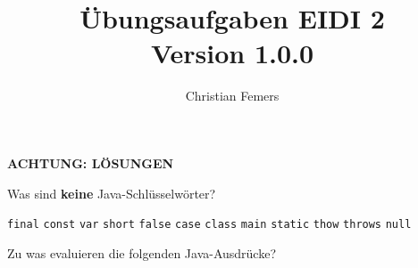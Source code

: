 \documentclass[11pt]{exam} %
\title{Übungsaufgaben EIDI 2 \\ \small \color{magenta}Version 1.0.0}
\author{Christian Femers}
\newcommand{\code}[1]{\texttt|#1|}
\newcommand{\fillinline}[1]{\ifprintanswers\fillin[\code{#1}][3cm]\fi\xrfill[-1pt]{0.2mm}}
\begin{document}
\maketitle


\ifprintanswers
\begin{framed}{\vspace{8.5cm}\begin{center}\color{red}\textbf{ACHTUNG: LÖSUNGEN}\end{center}\vspace{8.75cm}}\end{framed}
\newpage
\fi

\begin{questions}
\question Was sind \textbf{keine} Java-Schlüsselwörter?
\begin{checkboxes}
\choice \texttt{final}
\CorrectChoice \texttt{const}
\CorrectChoice \texttt{var}
\choice \texttt{short}
\CorrectChoice \texttt{false}
\choice \texttt{case}
\choice \texttt{class}
\CorrectChoice \texttt{main}
\choice \texttt{static}
\choice \texttt{thow}
\choice \texttt{throws}
\CorrectChoice \texttt{null}
\end{checkboxes}
\filbreak
\question Zu was evaluieren die folgenden Java-Ausdrücke? 
\end{questions}
\end{document}
